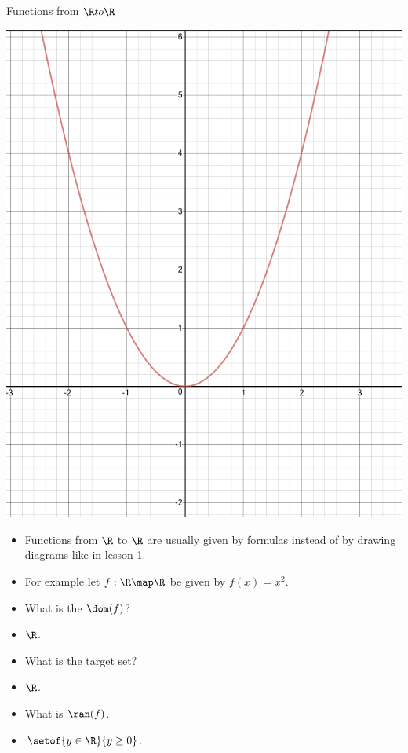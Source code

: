 \documentclass{beamer}
\begin{document}
\begin{frame}{Functions from $\R to \R$}

\includegraphics[scale=0.1]{parabola}

\begin{itemize}
\item Functions from $\R$ to $\R$ are usually given by formulas instead of
by drawing diagrams like in lesson 1.
\item For example let $f:\R\map\R$ be given by $f(x) = x^2$.
\item What is the $\dom(f)$?
\item $\R$.
\item What is the target set?
\item $\R$.
\item What is $\ran(f)$.
\item $\setof{y\in\R}{y\geq 0}$.
\end{itemize}

\end{frame}
\end{document}
